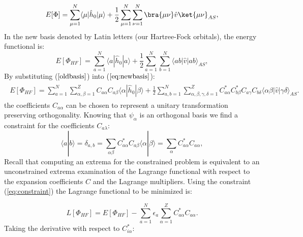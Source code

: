 \documentclass[twoside,english]{uiofysmaster}
\begin{document}
\begin{equation}
E[\Phi] = \sum_{\mu=1}^N \langle \mu | \hat{h}_0 | \mu \rangle + \frac{1}{2}\sum_{\mu=1}^N\sum_{\nu=1}^N \bra{\mu \nu}\hat{v}\ket{\mu \nu}_{AS},
\label{eq:funAS}
\end{equation}
In the new basis denoted by Latin letters (our Hartree-Fock orbitals), the energy functional is:
\begin{equation}
E[\Phi_{HF}] = \sum_{a=1}^N \langle a | \hat{h}_0 | a \rangle + \frac{1}{2}\sum_{a=1}^N\sum_{b=1}^N \langle ab|\hat{v}|ab\rangle_{AS},
\label{eq:newbasis}
\end{equation}
By substituting ($\ref{oldbasis}$) into ($\ref{eq:newbasis}$):
\begin{align}
\begin{split}
E[\Phi_{HF}] = \sum_{a=1}^N \sum_{\alpha ,\beta=1}^ZC_{a\alpha} C_{a\beta}\langle  \alpha | \hat{h}_0 | \beta \rangle + 
\frac{1}{2}\sum_{a,b=1}^N  \sum_{\alpha,\beta,\gamma,\delta=1}^Z C_{a\alpha }^*C_{b\beta}^* C_{a \gamma} C_{b \delta} \langle \alpha  \beta |\hat{v}|
\gamma \delta \rangle_{AS}.
\label{eq:newbasisintro}
\end{split}
\end{align}
the coefficients $C_{a \alpha}$ can be chosen to represent a unitary transformation preserving orthogonality. Knowing that $\psi_{\alpha}$ is an orthogonal basis we find a constraint for the coefficients $C_{a \lambda}$:
\begin{equation}
\langle a | b \rangle=\delta_{a,b}=\sum_{\alpha\beta} C^*_{a\alpha}C_{a\beta}\langle \alpha|\beta \rangle = \sum_{\alpha} C^*_{a\alpha}C_{a\alpha},
\label{eq:constraint}
\end{equation}
Recall that computing an extrema for the constrained problem is
equivalent to an unconstrained extrema examination of the Lagrange
functional with respect to the expansion coefficients $C$ and the
Lagrange multipliers.  Using the constraint (\ref{eq:constraint}) the
Lagrange functional to be minimized is:

\begin{equation}
L[\Phi_{HF}] = E[\Phi_{HF}] - \sum_{a=1}^N\epsilon_a\sum_{\alpha=1}^Z C^*_{a\alpha}C_{a\alpha}.
\end{equation}
Taking the derivative with respect to $C^*_{i\alpha}$:
\end{document}
